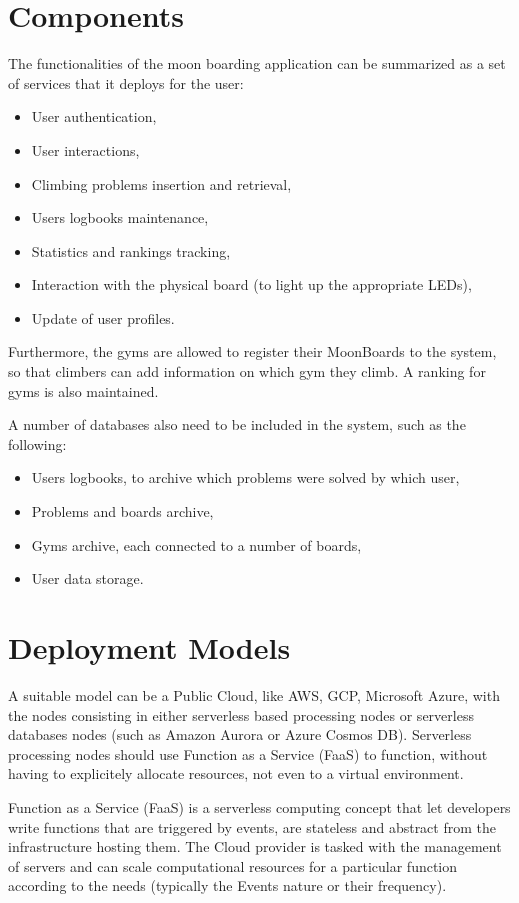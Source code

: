 \documentclass{article}
\begin{document}
\section{Components}\label{sec:components}
The functionalities of the moon boarding application can be summarized as a set of services that it deploys for the user:
\begin{itemize}
    \item User authentication,
    \item User interactions,
    \item Climbing problems insertion and retrieval,
    \item Users logbooks maintenance,
    \item Statistics and rankings tracking,
    \item Interaction with the physical board (to light up the appropriate LEDs),
    \item Update of user profiles.
\end{itemize}

Furthermore, the gyms are allowed to register their MoonBoards to the system, so that climbers can add information on which gym they climb. 
A ranking for gyms is also maintained.

A number of databases also need to be included in the system, such as the following:
\begin{itemize}
    \item Users logbooks, to archive which problems were solved by which user,
    \item Problems and boards archive,
    \item Gyms archive, each connected to a number of boards,
    \item User data storage.
\end{itemize}

\section{Deployment Models}\label{sec:models}

A suitable model can be a Public Cloud, like AWS, GCP, Microsoft Azure, with the nodes consisting in either serverless based processing nodes or serverless databases nodes (such as Amazon Aurora or Azure Cosmos DB). 
Serverless processing nodes should use Function as a Service (FaaS) to function, without having to explicitely allocate resources, not even to a virtual environment.

Function as a Service (FaaS) is a serverless computing concept that let developers write functions that are triggered by events, are stateless and abstract from the infrastructure hosting them. The Cloud provider is tasked with the management of servers and can scale computational resources for a particular function according to the needs (typically the Events nature or their frequency).
\end{document}
